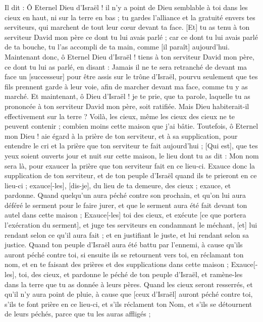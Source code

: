 \begin{multicols}{2}
Il dit : Ô Eternel Dieu d'Israël ! il n'y a point de Dieu semblable à toi dans les cieux en haut, ni sur la terre en bas ; tu gardes l'alliance et la gratuité envers tes serviteurs, qui marchent de tout leur cœur devant ta face.
[Et] tu as tenu à ton serviteur David mon père ce dont tu lui avais parlé ; car ce dont tu lui avais parlé de ta bouche, tu l'as accompli de ta main, comme [il paraît] aujourd'hui.
Maintenant donc, ô Eternel Dieu d'Israël ! tiens à ton serviteur David mon père, ce dont tu lui as parlé, en disant : Jamais il ne te sera retranché de devant ma face un [successeur] pour être assis sur le trône d'Israël, pourvu seulement que tes fils prennent garde à leur voie, afin de marcher devant ma face, comme tu y as marché.
Et maintenant, ô Dieu d'Israël ! je te prie, que ta parole, laquelle tu as prononcée à ton serviteur David mon père, soit ratifiée.
Mais Dieu habiterait-il effectivement sur la terre ? Voilà, les cieux, même les cieux des cieux ne te peuvent contenir ; combien moins cette maison que j'ai bâtie.
Toutefois, ô Eternel mon Dieu ! aie égard à la prière de ton serviteur, et à sa supplication, pour entendre le cri et la prière que ton serviteur te fait aujourd'hui ;
[Qui est], que tes yeux soient ouverts jour et nuit sur cette maison, le lieu dont tu as dit : Mon nom sera là, pour exaucer la prière que ton serviteur fait en ce lieu-ci.
Exauce donc la supplication de ton serviteur, et de ton peuple d'Israël quand ils te prieront en ce lieu-ci ; exauce[-les], [dis-je], du lieu de ta demeure, des cieux ; exauce, et pardonne.
Quand quelqu'un aura péché contre son prochain, et qu'on lui aura déféré le serment pour le faire jurer, et que le serment aura été fait devant ton autel dans cette maison ;
Exauce[-les] toi des cieux, et exécute [ce que portera l'exécration du serment], et juge tes serviteurs en condamnant le méchant, [et] lui rendant selon ce qu'il aura fait ; et en justifiant le juste, et lui rendant selon sa justice.
Quand ton peuple d'Israël aura été battu par l'ennemi, à cause qu'ils auront péché contre toi, si ensuite ils se retournent vers toi, en réclamant ton nom, et en te faisant des prières et des supplications dans cette maison ;
Exauce[-les], toi, des cieux, et pardonne le péché de ton peuple d'Israël, et ramène-les dans la terre que tu as donnée à leurs pères.
Quand les cieux seront resserrés, et qu'il n'y aura point de pluie, à cause que [ceux d'Israël] auront péché contre toi, s'ils te font prière en ce lieu-ci, et s'ils réclament ton Nom, et s'ils se détournent de leurs péchés, parce que tu les auras affligés ;

\end{multicols}
